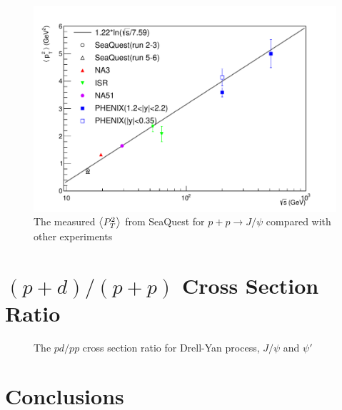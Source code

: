 \documentclass[twocolumn,aps,unsortedaddress,superscriptaddress,prd,floatfix,showpacs,linenumbers]{revtex4-2}
\begin{document}
\begin{figure}
	\centering
	\includegraphics[width=\linewidth]{crossSections/pT/pT_s_release}
	\caption{The measured $\expval{P_T^2}$ from SeaQuest for $p+p\rightarrow J/\psi$ compared with other experiments }
	\label{fig:pt_s}
\end{figure}

\section{$(p+d)/(p+p)$ Cross Section Ratio}
\label{sec:CSR}
\begin{figure}
	\caption{The $pd/pp$ cross section ratio for Drell-Yan process, $J/\psi$ and $\psi'$}
	\label{fig:pd/pp_csr}
\end{figure}

\section{Conclusions}
\label{sec:Conclusions}

\nocite{*}

\end{document}
